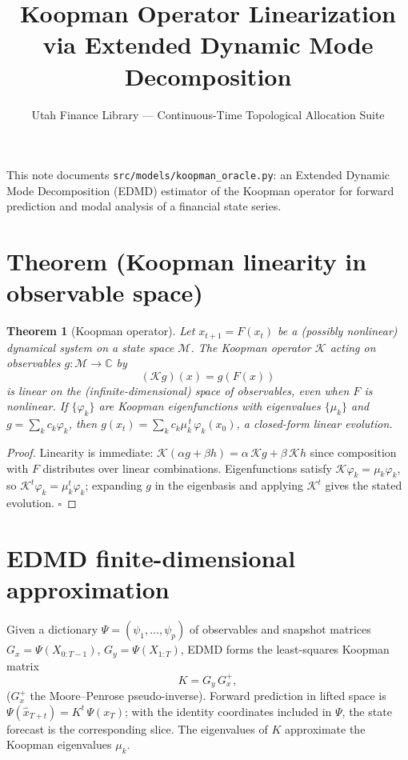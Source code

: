 \documentclass[11pt]{article}
\title{Koopman Operator Linearization via Extended Dynamic Mode Decomposition}
\author{Utah Finance Library --- Continuous-Time Topological Allocation Suite}
\date{}
\newtheorem{theorem}{Theorem}
\begin{document}
\maketitle

\noindent
This note documents \texttt{src/models/koopman\_oracle.py}: an Extended Dynamic
Mode Decomposition (EDMD) estimator of the Koopman operator for forward
prediction and modal analysis of a financial state series.

\section*{Theorem (Koopman linearity in observable space)}

\begin{theorem}[Koopman operator]
Let $x_{t+1} = F(x_t)$ be a (possibly nonlinear) dynamical system on a state space
$\mathcal{M}$. The Koopman operator $\mathcal{K}$ acting on observables
$g:\mathcal{M}\to\mathbb{C}$ by
\begin{equation}
(\mathcal{K} g)(x) = g(F(x))
\end{equation}
is \emph{linear} on the (infinite-dimensional) space of observables, even when
$F$ is nonlinear. If $\{\varphi_k\}$ are Koopman eigenfunctions with eigenvalues
$\{\mu_k\}$ and $g = \sum_k c_k \varphi_k$, then
$g(x_t) = \sum_k c_k \mu_k^{\,t}\,\varphi_k(x_0)$, a closed-form linear evolution.
\end{theorem}

\begin{proof}
Linearity is immediate: $\mathcal{K}(\alpha g + \beta h) = \alpha\,\mathcal{K}g +
\beta\,\mathcal{K}h$ since composition with $F$ distributes over linear
combinations. Eigenfunctions satisfy $\mathcal{K}\varphi_k = \mu_k \varphi_k$, so
$\mathcal{K}^t \varphi_k = \mu_k^t \varphi_k$; expanding $g$ in the eigenbasis and
applying $\mathcal{K}^t$ gives the stated evolution. $\square$
\end{proof}

\section*{EDMD finite-dimensional approximation}

Given a dictionary $\Psi = (\psi_1,\dots,\psi_p)$ of observables and snapshot
matrices $G_x = \Psi(X_{0:T-1})$, $G_y = \Psi(X_{1:T})$, EDMD forms the
least-squares Koopman matrix
\begin{equation}
K = G_y\,G_x^{+},
\end{equation}
($G_x^+$ the Moore--Penrose pseudo-inverse). Forward prediction in lifted space is
$\Psi(\hat x_{T+t}) = K^t\,\Psi(x_T)$; with the identity coordinates included in
$\Psi$, the state forecast is the corresponding slice. The eigenvalues of $K$
approximate the Koopman eigenvalues $\mu_k$.
\end{document}
